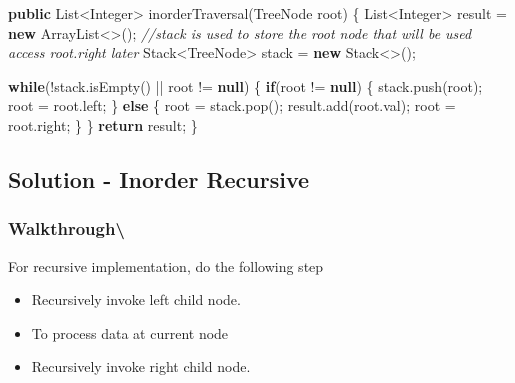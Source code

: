 \documentclass[]{book}
\newenvironment{Shaded}{\begin{snugshade}}{\end{snugshade}}
\newcommand{\BuiltInTok}[1]{#1}
\newcommand{\CommentTok}[1]{\textcolor[rgb]{0.56,0.35,0.01}{\textit{#1}}}
\newcommand{\FunctionTok}[1]{\textcolor[rgb]{0.00,0.00,0.00}{#1}}
\newcommand{\KeywordTok}[1]{\textcolor[rgb]{0.13,0.29,0.53}{\textbf{#1}}}
\newcommand{\NormalTok}[1]{#1}
\providecommand{\tightlist}{%
  \setlength{\itemsep}{0pt}\setlength{\parskip}{0pt}}
\begin{document}
\begin{Shaded}
\begin{Highlighting}[]
\KeywordTok{public} \BuiltInTok{List}\NormalTok{<}\BuiltInTok{Integer}\NormalTok{> }\FunctionTok{inorderTraversal}\NormalTok{(}\BuiltInTok{TreeNode}\NormalTok{ root) \{}
    \BuiltInTok{List}\NormalTok{<}\BuiltInTok{Integer}\NormalTok{> result = }\KeywordTok{new} \BuiltInTok{ArrayList}\NormalTok{<>();}
    \CommentTok{//stack is used to store the root node that will be used access root.right later}
    \BuiltInTok{Stack}\NormalTok{<}\BuiltInTok{TreeNode}\NormalTok{> stack = }\KeywordTok{new} \BuiltInTok{Stack}\NormalTok{<>();}

    \KeywordTok{while}\NormalTok{(!stack.}\FunctionTok{isEmpty}\NormalTok{() || root != }\KeywordTok{null}\NormalTok{) \{}
        \KeywordTok{if}\NormalTok{(root != }\KeywordTok{null}\NormalTok{) \{}
\NormalTok{            stack.}\FunctionTok{push}\NormalTok{(root);}
\NormalTok{            root = root.}\FunctionTok{left}\NormalTok{;}
\NormalTok{        \} }\KeywordTok{else}\NormalTok{ \{}
\NormalTok{            root = stack.}\FunctionTok{pop}\NormalTok{();}
\NormalTok{            result.}\FunctionTok{add}\NormalTok{(root.}\FunctionTok{val}\NormalTok{);}
\NormalTok{            root = root.}\FunctionTok{right}\NormalTok{;}
\NormalTok{        \}}
\NormalTok{    \}}
    \KeywordTok{return}\NormalTok{ result;}
\NormalTok{\}}
\end{Highlighting}
\end{Shaded}

\hypertarget{solution---inorder-recursive}{%
\subsection{Solution - Inorder Recursive}\label{solution---inorder-recursive}}

\hypertarget{walkthrough-70}{%
\subsubsection{Walkthrough\textbackslash{}}\label{walkthrough-70}}

For recursive implementation, do the following step

\begin{itemize}
\tightlist
\item
  Recursively invoke left child node.
\item
  To process data at current node
\item
  Recursively invoke right child node.
\end{itemize}
\end{document}
